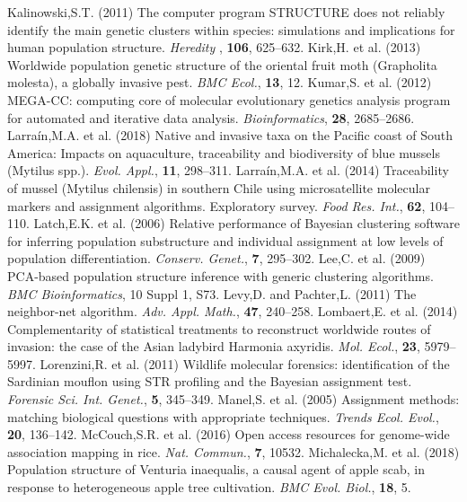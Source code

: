 \documentclass[final]{bioinfo}
\begin{document}
\begin{thebibliography}{}
\bibitem[a ()]{}Kalinowski,S.T. (2011) The computer program STRUCTURE does not reliably identify the main genetic clusters within species: simulations and implications for human population structure. \textit{Heredity }, \textbf{106}, 625–632.
\bibitem[a ()]{}Kirk,H. et al. (2013) Worldwide population genetic structure of the oriental fruit moth (Grapholita molesta), a globally invasive pest. \textit{BMC Ecol.}, \textbf{13}, 12.
\bibitem[a ()]{}Kumar,S. et al. (2012) MEGA-CC: computing core of molecular evolutionary genetics analysis program for automated and iterative data analysis. \textit{Bioinformatics}, \textbf{28}, 2685–2686.
\bibitem[a ()]{}Larraín,M.A. et al. (2018) Native and invasive taxa on the Pacific coast of South America: Impacts on aquaculture, traceability and biodiversity of blue mussels (Mytilus spp.). \textit{Evol. Appl.}, \textbf{11}, 298–311.
\bibitem[a ()]{}Larraín,M.A. et al. (2014) Traceability of mussel (Mytilus chilensis) in southern Chile using microsatellite molecular markers and assignment algorithms. Exploratory survey. \textit{Food Res. Int.}, \textbf{62}, 104–110.
\bibitem[a ()]{}Latch,E.K. et al. (2006) Relative performance of Bayesian clustering software for inferring population substructure and individual assignment at low levels of population differentiation. \textit{Conserv. Genet.}, \textbf{7}, 295–302.
\bibitem[a ()]{}Lee,C. et al. (2009) PCA-based population structure inference with generic clustering algorithms. \textit{BMC Bioinformatics}, 10 Suppl 1, S73.
\bibitem[a ()]{}Levy,D. and Pachter,L. (2011) The neighbor-net algorithm. \textit{Adv. Appl. Math.}, \textbf{47}, 240–258.
\bibitem[a ()]{}Lombaert,E. et al. (2014) Complementarity of statistical treatments to reconstruct worldwide routes of invasion: the case of the Asian ladybird Harmonia axyridis. \textit{Mol. Ecol.}, \textbf{23}, 5979–5997.
\bibitem[a ()]{}Lorenzini,R. et al. (2011) Wildlife molecular forensics: identification of the Sardinian mouflon using STR profiling and the Bayesian assignment test. \textit{Forensic Sci. Int. Genet.}, \textbf{5}, 345–349.
\bibitem[a ()]{}Manel,S. et al. (2005) Assignment methods: matching biological questions with appropriate techniques. \textit{Trends Ecol. Evol.}, \textbf{20}, 136–142.
\bibitem[a ()]{}McCouch,S.R. et al. (2016) Open access resources for genome-wide association mapping in rice. \textit{Nat. Commun.},\textbf{ 7}, 10532.
\bibitem[a ()]{}Michalecka,M. et al. (2018) Population structure of Venturia inaequalis, a causal agent of apple scab, in response to heterogeneous apple tree cultivation. \textit{BMC Evol. Biol.}, \textbf{18}, 5.

\end{thebibliography}
\end{document}
